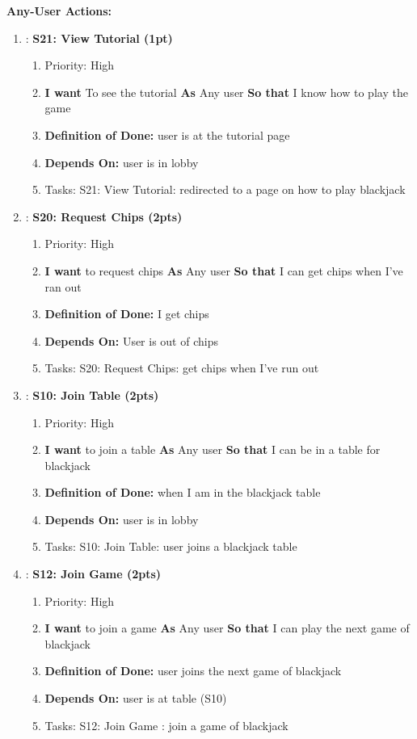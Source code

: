 \textbf{Any-User Actions:}
\begin{enumerate}
    \item: \textbf{S21: View Tutorial (1pt)}
    \begin{enumerate}
        \item Priority: High
        \item \textbf{I want} To see the tutorial \textbf{As} Any user \textbf{So that} I know how to play the game
        \item \textbf{Definition of Done:} user is at the tutorial page
        \item \textbf{Depends On:} user is in lobby
        \item Tasks: S21: View Tutorial: redirected to a page on how to play blackjack
    \end{enumerate}

    \item: \textbf{S20: Request Chips (2pts)}
    \begin{enumerate}
        \item Priority: High
        \item \textbf{I want} to request chips \textbf{As} Any user \textbf{So that} I can get chips when I've ran out 
        \item \textbf{Definition of Done:} I get chips
        \item \textbf{Depends On:} User is out of chips
        \item Tasks: S20: Request Chips: get chips when I've run out 
    \end{enumerate}
    
    \item: \textbf{S10: Join Table (2pts)}
    \begin{enumerate}
        \item Priority: High
        \item \textbf{I want} to join a table \textbf{As} Any user \textbf{So that} I can be in a table for blackjack
        \item \textbf{Definition of Done:} when I am in the blackjack table
        \item \textbf{Depends On:} user is in lobby
        \item Tasks: S10: Join Table: user joins a blackjack table
    \end{enumerate}

    \item: \textbf{S12: Join Game (2pts)}
    \begin{enumerate}
        \item Priority: High
        \item \textbf{I want} to join a game \textbf{As} Any user \textbf{So that} I can play the next game of blackjack
        \item \textbf{Definition of Done:} user joins the next game of blackjack
        \item \textbf{Depends On:} user is at table (S10)
        \item Tasks: S12: Join Game : join a game of blackjack
    \end{enumerate}


\end{enumerate}
